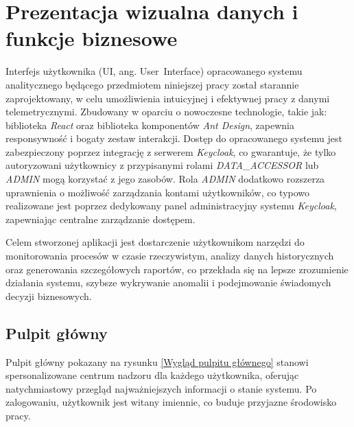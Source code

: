 \section{Prezentacja wizualna danych i funkcje biznesowe}
\label{chap:prezentacja_wizualna}

Interfejs użytkownika (UI, ang. \mbox{User Interface}) opracowanego systemu analitycznego będącego przedmiotem niniejszej pracy został starannie zaprojektowany, w celu umożliwienia intuicyjnej i efektywnej pracy z danymi telemetrycznymi. Zbudowany w oparciu o nowoczesne technologie, takie jak: biblioteka \textit{React} oraz biblioteka komponentów \textit{Ant Design}, zapewnia responsywność i bogaty zestaw interakcji. Dostęp do opracowanego systemu jest zabezpieczony poprzez integrację z serwerem \textit{Keycloak}, co gwarantuje, że tylko autoryzowani użytkownicy z przypisanymi rolami \textit{DATA\_ACCESSOR} lub \textit{ADMIN} mogą korzystać z jego zasobów. Rola \textit{ADMIN} dodatkowo rozszerza uprawnienia o możliwość zarządzania kontami użytkowników, co typowo realizowane jest poprzez dedykowany panel administracyjny systemu \textit{Keycloak}, zapewniając centralne zarządzanie dostępem.

Celem stworzonej aplikacji jest dostarczenie użytkownikom narzędzi do monitorowania procesów w czasie rzeczywistym, analizy danych historycznych oraz generowania szczegółowych raportów, co przekłada się na lepsze zrozumienie działania systemu, szybsze wykrywanie anomalii i podejmowanie świadomych decyzji biznesowych.

\subsection{Pulpit główny}

Pulpit główny pokazany na rysunku \ref{Wygląd pulpitu głównego} stanowi spersonalizowane centrum nadzoru dla każdego użytkownika, oferując natychmiastowy przegląd najważniejszych informacji o stanie systemu. Po zalogowaniu, użytkownik jest witany imiennie, co buduje przyjazne środowisko pracy.


